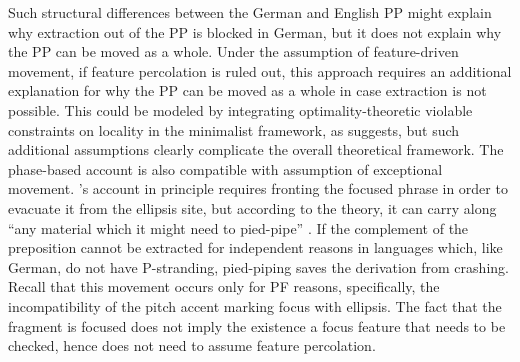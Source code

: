 Such structural differences between the German and English PP might explain why extraction out of the PP is blocked in German, but it does not explain why the PP can be moved as a whole. Under the assumption of feature-driven movement, if feature percolation is ruled out, this approach requires an additional explanation for why the PP can be moved as a whole in case extraction is not possible. This could be modeled by integrating optimality-theoretic violable constraints on locality in the minimalist framework, as \citet{heck2008} suggests, but such additional assumptions clearly complicate the overall theoretical framework. The phase-based account is also compatible with  assumption of exceptional movement. \citeauthor{weir2014}'s account in principle requires fronting the focused phrase in order to evacuate it from the ellipsis site, but according to the theory, it can carry along ``any material which it might need to pied-pipe'' \citep[186]{weir2014}. If the complement of the preposition cannot be extracted for independent reasons in languages which, like German, do not have P-stranding, pied-piping saves the derivation from crashing. Recall that this movement occurs only for PF reasons, specifically, the incompatibility of the pitch accent marking focus with ellipsis. The fact that the fragment is focused does not imply the existence a focus feature that needs to be checked, hence \citeauthor{weir2014} does not need to assume feature percolation.\largerpage[-1]

